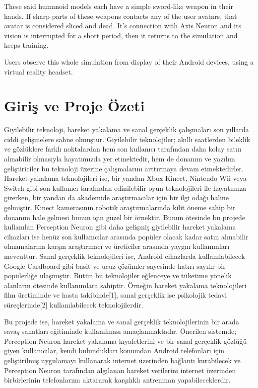 \documentclass[a4paper, 12pt, titlepage]{article}
\begin{document}
These said humanoid models each have a simple sword-like weapon in their hands. If sharp parts of
these weapons contacts any of the user avatars, that avatar is considered sliced and dead. It’s
connection with Axis Neuron and its vision is interrupted for a short period, then it returns to
the simulation and keeps training.

Users observe this whole simulation from display of their Android devices, using a virtual reality
headset.

\newpage
\renewcommand*\contentsname{İçindekiler}
\tableofcontents
\newpage

\section{Giriş ve Proje Özeti}
Giyilebilir teknoloji, hareket yakalama ve sanal gerçeklik çalışmaları son yıllarda ciddi
gelişmelere sahne olmuştur. Giyilebilir teknolojiler; akıllı saatlerden bileklik ve gözlüklere
farklı noktalardan hem son kullanıcı tarafından daha kolay satın alınabilir olmasıyla hayatımızda
yer etmektedir, hem de donanım ve yazılım geliştiriciler bu teknoloji üzerine çalışmalarını
arttırmaya devam etmektedirler. Hareket yakalama teknolojileri ise, bir yandan Xbox Kinect,
Nintendo Wii veya Switch gibi son kullanıcı tarafından edinilebilir oyun teknolojileri ile
hayatımıza girerken, bir yandan da akademide araştırmacılar için bir ilgi odağı haline gelmiştir.
Kinect kamerasının robotik araştırmalarında kilit öneme sahip bir donanım hale gelmesi bunun için
güzel bir örnektir. Bunun ötesinde bu projede kullanılan Perception Neuron gibi daha gelişmiş
giyilebilir hareket yakalama cihazları ise henüz son kullanıcılar arasında popüler olacak kadar
satın alınabilir olmamalarına karşın araştırmacı ve üreticiler arasında yaygın kullanımları
mevcuttur. Sanal gerçeklik teknolojileri ise, Android cihazlarda kullanılabilecek Google Cardboard
gibi basit ve ucuz çözümler sayesinde hatırı sayılır bir popülerliğe ulaşmıştır. Bütün bu
teknolojiler eğlenceye ve tüketime yönelik alanların ötesinde kullanımlara sahiptir. Örneğin
hareket yakalama teknolojileri film üretiminde ve hasta takibinde[1], sanal gerçeklik ise
psikolojik tedavi süreçlerinde[2] kullanılabilecek teknolojilerdir.

Bu projede ise, hareket yakalama ve sanal gerçeklik teknolojilerinin bir arada savaş sanatları
eğitiminde kullanılması amaçlanmaktadır. Önerilen sistemde; Perception Neuron hareket yakalama
kıyafetlerini ve bir sanal gerçeklik gözlüğü giyen kullanıcılar, kendi bulundukları konumdan
Android telefonları için geliştirilmiş uygulamayı kullanarak internet üzerinden bağlantı
kurabilecek ve Perception Neuron tarafından algılanan hareket verilerini internet üzerinden
birbirlerinin telefonlarına aktararak karşılıklı antrenman yapabileceklerdir.
\end{document}
